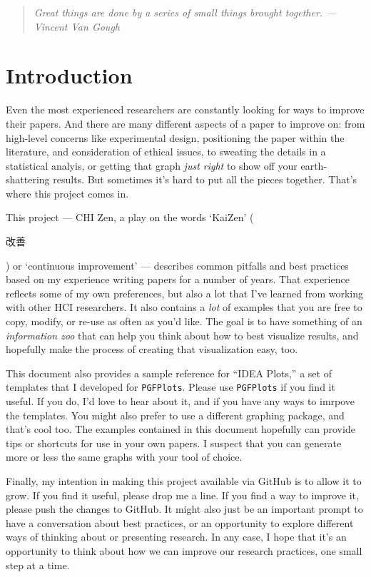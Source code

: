 
\vspace{2em}
\begin{quote}
    \emph{Great things are done by a series of small things brought together. --- Vincent Van Gough}
\end{quote}


\section{Introduction}

Even the most experienced researchers are constantly looking for ways to improve their papers. And there are many different aspects of a paper to improve on: from high-level concerns like experimental design, positioning the paper within the literature, and consideration of ethical issues, to sweating the details in a statistical analyis, or getting that graph \emph{just right} to show off your earth-shattering results. But sometimes it's hard to put all the pieces together. That's where this project comes in. 

This project --- CHI Zen, a play on the words `KaiZen' (\begin{CJK}{UTF8}{min}改善\end{CJK}) or `continuous improvement' --- describes common pitfalls and best practices based on my experience writing papers for a number of years. That experience reflects some of my own preferences, but also a lot that I've learned from working with other HCI researchers. It also contains a \emph{lot} of examples that you are free to copy, modify, or re-use as often as you'd like. The goal is to have something of an \emph{information zoo} \citep{heer2010tour} that can help you think about how to best visualize results, and hopefully make the process of creating that visualization easy, too. 

This document also provides a sample reference for ``IDEA Plots,'' a set of templates that I developed for \texttt{PGFPlots}. Please use \texttt{PGFPlots} if you find it useful. If you do, I'd love to hear about it, and if you have any ways to imrpove the templates. You might also prefer to use a different graphing package, and that's cool too. The examples contained in this document hopefully can provide tips or shortcuts for use in your own papers. I suspect that you can generate more or less the same graphs with your tool of choice. 

Finally, my intention in making this project available via GitHub is to allow it to grow. If you find it useful, please drop me a line. If you find a way to improve it, please push the changes to GitHub. It might also just be an important prompt to have a conversation about best practices, or an opportunity to explore different ways of thinking about or presenting research. In any case, I hope that it's an opportunity to think about how we can improve our research practices, one small step at a time. 

